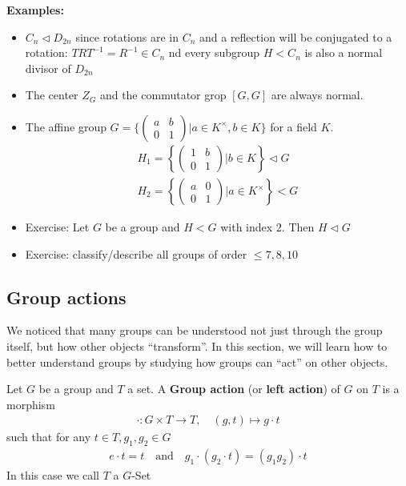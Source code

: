 \textbf{Examples:}
\begin{itemize}
	\item $C_n \lhd D_{2n}$ since rotations are in $C_n$ and a reflection will be conjugated to a rotation: $TRT^{-1} = R^{-1} \in C_n$ nd every subgroup $H < C_n$ is also a normal divisor of $D_{2n}$
	\item The center $Z_G$ and the commutator grop $[G,G]$ are always normal.
	\item The affine group $G = \{\begin{pmatrix}
	a & b\\
	0 & 1
	\end{pmatrix} \big\vert a \in K^{\times}, b \in K\}$ for a field $K$.
	\begin{align*}
		H_1 = \left\{\begin{pmatrix}
		1 & b\\
		0 & 1
		\end{pmatrix}\big\vert b \in K\right\} \lhd G\\
		H_2 = \left\{\begin{pmatrix}
		a & 0\\
		0 & 1
		\end{pmatrix} \big\vert a \in K^{\times}\right\} < G
	\end{align*}
\item Exercise: Let $G$ be a group and $H < G$ with index $2$. Then $H \lhd G$
\item Exercise: classify/describe all groups of order $\leq 7,8,10$
\end{itemize}


\subsection{Group actions}
We noticed that many groups can be understood not just through the group itself, but how other objects ``transform''. In this section, we will learn how to better understand groups by studying how groups can ``act'' on other objects.

\begin{definition}[]
	Let $G$ be a group and $T$ a set. A \textbf{Group action} (or \textbf{left action}) of $G$ on $T$ is a morphism
	\begin{align*}
		\cdot: G \times T \to T, \quad (g,t) \mapsto g \cdot t	
	\end{align*}
	such that for any $t \in T, g_1,g_2 \in G$
	\begin{align*}
		e \cdot t = t \quad \text{and} \quad g_1 \cdot (g_2 \cdot t) = (g_1g_2) \cdot t
	\end{align*}
	In this case we call $T$ a $G$-Set
\end{definition} 

